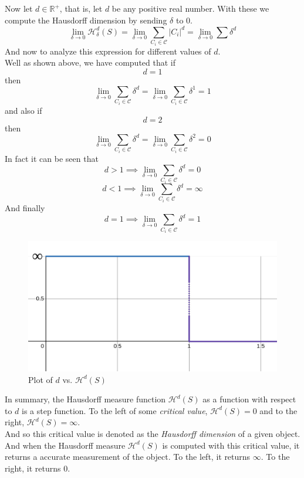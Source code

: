 \documentclass[11pt]{ekblite}
\begin{document}
\begin{example}
	Now let $d \in \mathbb{R}^+$, that is, let $d$ be any positive real number. With these we compute the Hausdorff dimension by sending $\delta$ to 0.
	\[\lim_{\delta \rightarrow 0} \mathcal{H}_{\delta}^{d} (S) = \lim_{\delta \rightarrow 0} \sum_{C_i \in \mathcal{C}} |C_i|^d = \lim_{\delta \rightarrow 0} \sum \delta^d\]
	And now to analyze this expression for different values of $d$. 
	\\[0.2in]Well as shown above, we have computed that if
	\[d = 1\]
	then
	\[\lim_{\delta \rightarrow 0} \sum_{C_i \in \mathcal{C}} \delta^d = \lim_{\delta \rightarrow 0} \sum_{C_i \in \mathcal{C}} \delta^1 = 1\]
	and also if
	\[d = 2\]
	then
	\[\lim_{\delta \rightarrow 0} \sum_{C_i \in \mathcal{C}} \delta^d = \lim_{\delta \rightarrow 0} \sum_{C_i \in \mathcal{C}} \delta^2 = 0\]
	In fact it can be seen that
	\[d > 1 \implies \lim_{\delta \rightarrow 0} \sum_{C_i \in \mathcal{C}} \delta^d = 0\]
	\[d < 1 \implies \lim_{\delta \rightarrow 0} \sum_{C_i \in \mathcal{C}} \delta^d = \infty\]
	And finally
	\[d = 1 \implies \lim_{\delta \rightarrow 0} \sum_{C_i \in \mathcal{C}} \delta^d = 1\]
\end{example}
\begin{figure}[h]
	\includegraphics[scale=0.28]{img/c23.jpg}
	\caption{Plot of $d$ vs. $\mathcal{H}^d (S)$}
\end{figure}
\begin{definition}
	In summary, the Hausdorff measure function $\mathcal{H}^d (S)$ as a function with respect to $d$ is a step function. To the left of some \textit{critical value}, $\mathcal{H}^d (S) = 0$ and to the right, $\mathcal{H}^d (S) = \infty$.
	\\[0.2in]And so this critical value is denoted as the \textit{Hausdorff dimension} of a given object. And when the Hausdorff measure $\mathcal{H}^d (S)$ is computed with this critical value, it returns a accurate measurement of the object. To the left, it returns $\infty$. To the right, it returns 0.
\end{definition}
\end{document}
